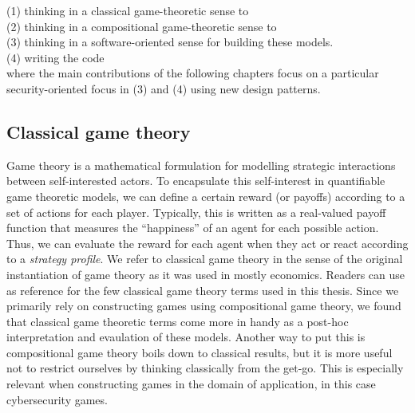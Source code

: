 \documentclass[11pt,titlepage,dvipsnames,table,xcdraw,english]{article}
\begin{document}
(1) thinking in a classical game-theoretic sense to \\
(2) thinking in a compositional game-theoretic sense to \\
(3) thinking in a software-oriented sense for building these models.\\
(4) writing the code \\

where the main contributions of the following chapters focus on a particular security-oriented focus in (3) and (4) using new design patterns. 


\subsection{Classical game theory}


Game theory is a mathematical formulation for modelling strategic interactions between self-interested actors. To encapsulate this self-interest in quantifiable game theoretic models, we can define a certain reward (or payoffs) according to a set of actions for each player. Typically, this is written as a real-valued payoff function that measures the ``happiness'' of an agent for each possible action. Thus, we can evaluate the reward for each agent when they act or react according to a \textit{strategy profile}. We refer to classical game theory in the sense of the original instantiation of game theory as it was used in mostly economics. Readers can use \cite{leyton2008essentials} as reference for the few classical game theory terms used in this thesis.
Since we primarily rely on constructing games using compositional game theory, we found that classical game theoretic terms come more in handy as a post-hoc interpretation and evaulation of these models. Another way to put this is compositional game theory boils down to classical results, but it is more useful not to restrict ourselves by thinking classically from the get-go. This is especially relevant when constructing games in the domain of application, in this case cybersecurity games. 


\end{document}
